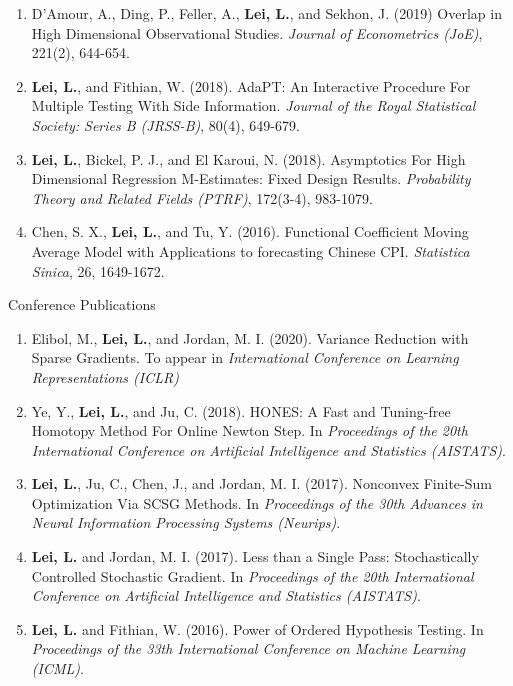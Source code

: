 \documentclass{article}
\begin{document}
\begin{enumerate}
\item D'Amour, A., Ding, P., Feller, A., \textbf{Lei, L.}, and Sekhon, J. (2019) Overlap in High Dimensional Observational Studies. \emph{Journal of Econometrics (JoE)}, 221(2), 644-654.
\item \textbf{Lei, L.}, and Fithian, W. (2018). AdaPT: An Interactive Procedure For Multiple Testing With Side Information. \emph{Journal of the Royal Statistical Society: Series B (JRSS-B)}, 80(4), 649-679.
\item \textbf{Lei, L.}, Bickel, P. J., and El Karoui, N. (2018). Asymptotics For High Dimensional Regression M-Estimates: Fixed Design Results. \emph{Probability Theory and Related Fields (PTRF)}, 172(3-4), 983-1079.
\item Chen, S. X., \textbf{Lei, L.}, and Tu, Y. (2016). Functional Coefficient Moving Average Model with Applications to forecasting Chinese CPI. \emph{Statistica Sinica}, 26, 1649-1672.
\end{enumerate}

\begin{large}
\noindent Conference Publications
\end{large}

\begin{enumerate}
\item Elibol, M., \textbf{Lei, L.}, and Jordan, M. I. (2020). Variance Reduction with Sparse Gradients. To appear in \emph{International Conference on Learning Representations (ICLR)}
\item Ye, Y., \textbf{Lei, L.}, and Ju, C. (2018). HONES: A Fast and Tuning-free Homotopy Method For Online Newton Step. In \emph{Proceedings of the 20th International Conference on Artificial Intelligence and Statistics (AISTATS)}.
\item \textbf{Lei, L.}, Ju, C., Chen, J., and Jordan, M. I. (2017). Nonconvex Finite-Sum Optimization Via SCSG Methods. In \emph{Proceedings of the 30th Advances in Neural Information Processing Systems (Neurips)}.
\item \textbf{Lei, L.} and Jordan, M. I. (2017). Less than a Single Pass: Stochastically Controlled Stochastic Gradient. In \emph{Proceedings of the 20th International Conference on Artificial Intelligence and Statistics (AISTATS)}.
\item \textbf{Lei, L.} and Fithian, W. (2016). Power of Ordered Hypothesis Testing. In \emph{Proceedings of the 33th International Conference on Machine Learning (ICML)}.
\end{enumerate}
\end{document}
